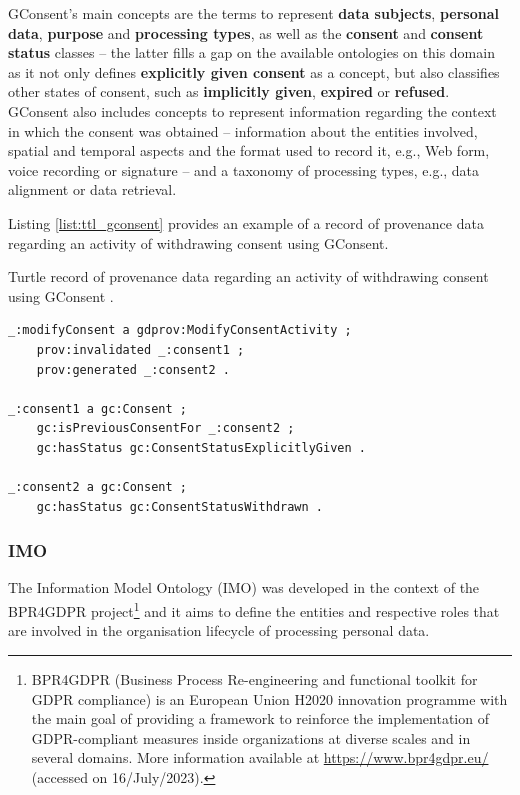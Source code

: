 GConsent's main concepts are the terms to represent \textbf{data subjects}, \textbf{personal data}, \textbf{purpose} and \textbf{processing types}, as well as the \textbf{consent} and \textbf{consent status} classes -- the latter fills a gap on the available ontologies on this domain as it not only defines \textbf{explicitly given consent} as a concept, but also classifies other states of consent, such as \textbf{implicitly given}, \textbf{expired} or \textbf{refused}.
GConsent also includes concepts to represent information regarding the context in which the consent was obtained -- information about the entities involved, spatial and temporal aspects and the format used to record it, e.g., Web form, voice recording or signature -- and a taxonomy of processing types, e.g., data alignment or data retrieval.

Listing \ref{list:ttl_gconsent} provides an example of a record of provenance data regarding an activity of withdrawing consent using GConsent.

\begin{listing}
\caption{Turtle record of provenance data regarding an activity of withdrawing consent using GConsent \citep{hitzler_gconsent_2019}.}
\label{list:ttl_gconsent}
\begin{verbatim}
_:modifyConsent a gdprov:ModifyConsentActivity ;
    prov:invalidated _:consent1 ;
    prov:generated _:consent2 .

_:consent1 a gc:Consent ;
    gc:isPreviousConsentFor _:consent2 ;
    gc:hasStatus gc:ConsentStatusExplicitlyGiven .

_:consent2 a gc:Consent ;
    gc:hasStatus gc:ConsentStatusWithdrawn .
\end{verbatim}
\end{listing}

\subsubsection{IMO}
\label{sec:imo}

The Information Model Ontology (IMO) \citep{papagiannakopoulou_leveraging_2014,lioudakis_compliance_2019} was developed in the context of the BPR4GDPR project\footnote{BPR4GDPR (Business Process Re-engineering and functional toolkit for GDPR compliance) is an European Union H2020 innovation programme with the main goal of providing a framework to reinforce the implementation of GDPR-compliant measures inside organizations at diverse scales and in several domains. More information available at \url{https://www.bpr4gdpr.eu/} (accessed on 16/July/2023).} and it aims to define the entities and respective roles that are involved in the organisation lifecycle of processing personal data.


